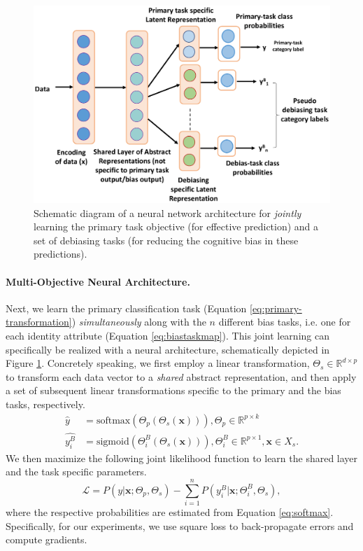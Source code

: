\documentclass[letterpaper]{article}
\renewcommand{\vec}[1]{\mathbf{#1}}
\begin{document}
\begin{figure}[t]
    \centering
    \includegraphics[width=.85\columnwidth]{debias-architecture.pdf}
    \caption{Schematic diagram of a neural network architecture for \emph{jointly} learning the primary task objective (for effective prediction) and a set of debiasing tasks (for reducing the cognitive bias in these predictions).}
\label{fig:deBiasArch}
\end{figure}


\paragraph{Multi-Objective Neural Architecture.}

Next, we learn the
primary classification task (Equation \ref{eq:primary-transformation}) \emph{simultaneously} along with the $n$ different bias tasks, i.e. one for each identity attribute (Equation \ref{eq:biastaskmap}).
This joint learning can specifically be realized with a neural architecture, schematically depicted in Figure \ref{fig:deBiasArch}. Concretely speaking, we first employ a linear transformation, $\Theta_s \in \mathbb{R}^{d\times p}$ to transform each data vector to a \emph{shared} abstract representation, and then apply a set of subsequent linear transformations specific to the primary and the bias tasks, respectively.
\begin{equation}
\begin{split}
\hat{y} & = \mathrm{softmax}(\Theta_p(\Theta_s(\vec{x}))), \Theta_p \in \mathbb{R}^{p \times k} \\
\hat{y^B_i} & = \mathrm{sigmoid}(\Theta^B_i(\Theta_s(\vec{x}))), \Theta^B_{i} \in \mathbb{R}^{p \times 1}, \vec{x} \in X_s \label{eq:softmax}.
\end{split}
\end{equation}
We then maximize the following joint likelihood function to learn the shared layer and the task specific parameters.
\begin{equation}
\mathcal{L}=P(y|\vec{x};\Theta_p,\Theta_s) - \sum_{i=1}^{n} P(y^B_i|\vec{x};\Theta^B_{i},\Theta_s), \label{eq:jointloss}
\end{equation}
where the respective probabilities are estimated from Equation \ref{eq:softmax}. Specifically, for our experiments, we use square loss to back-propagate errors and compute gradients. 
\end{document}
